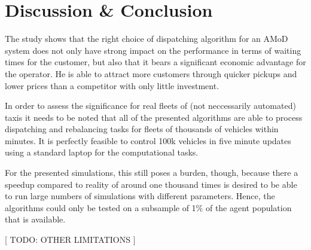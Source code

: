 \section{Discussion \& Conclusion}
\label{sec:Conclusion}

The study shows that the right choice of dispatching algorithm for an AMoD system
does not only have strong impact on the performance in terms of waiting times for
the customer, but also that it bears a significant economic advantage for the
operator. He is able to attract more customers through quicker pickups and
lower prices than a competitor with only little investment.

In order to assess the significance for real fleets of (not neccessarily
automated) taxis it needs to be noted that all of the presented algorithms are
able to process dispatching and rebalancing tasks for fleets of thousands of
vehicles within minutes. It is perfectly feasible to control 100k vehicles in
five minute updates using a standard laptop for the computational tasks.

For the presented simulations, this still poses a burden, though, because there
a speedup compared to reality of around one thousand times is desired to be able
to run large numbers of simulations with different parameters. Hence, the algorithms
could only be tested on a subsample of 1\% of the agent population that is available.

[ TODO: OTHER LIMITATIONS ]
